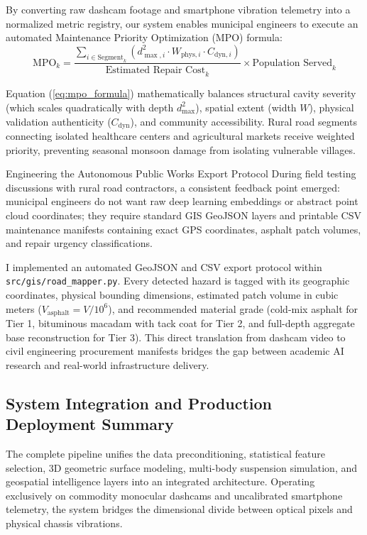 By converting raw dashcam footage and smartphone vibration telemetry into a normalized metric registry, our system enables municipal engineers to execute an automated Maintenance Priority Optimization (MPO) formula:
\begin{equation}
    \text{MPO}_k = \frac{\sum_{i \in \text{Segment}_k} \left( d_{\max, i}^2 \cdot W_{\text{phys}, i} \cdot C_{\text{dyn}, i} \right)}{\text{Estimated Repair Cost}_k} \times \text{Population Served}_k
    \label{eq:mpo_formula}
\end{equation}

Equation (\ref{eq:mpo_formula}) mathematically balances structural cavity severity (which scales quadratically with depth $d_{\max}^2$), spatial extent (width $W$), physical validation authenticity ($C_{\text{dyn}}$), and community accessibility. Rural road segments connecting isolated healthcare centers and agricultural markets receive weighted priority, preventing seasonal monsoon damage from isolating vulnerable villages.

\begin{designreflection}{Engineering the Autonomous Public Works Export Protocol}
During field testing discussions with rural road contractors, a consistent feedback point emerged: municipal engineers do not want raw deep learning embeddings or abstract point cloud coordinates; they require standard GIS GeoJSON layers and printable CSV maintenance manifests containing exact GPS coordinates, asphalt patch volumes, and repair urgency classifications.

I implemented an automated GeoJSON and CSV export protocol within \texttt{src/gis/road\_mapper.py}. Every detected hazard is tagged with its geographic coordinates, physical bounding dimensions, estimated patch volume in cubic meters ($V_{\text{asphalt}} = V / 10^6$), and recommended material grade (cold-mix asphalt for Tier 1, bituminous macadam with tack coat for Tier 2, and full-depth aggregate base reconstruction for Tier 3). This direct translation from dashcam video to civil engineering procurement manifests bridges the gap between academic AI research and real-world infrastructure delivery.
\end{designreflection}

\subsection{System Integration and Production Deployment Summary}
The complete pipeline unifies the data preconditioning, statistical feature selection, 3D geometric surface modeling, multi-body suspension simulation, and geospatial intelligence layers into an integrated architecture. Operating exclusively on commodity monocular dashcams and uncalibrated smartphone telemetry, the system bridges the dimensional divide between optical pixels and physical chassis vibrations. 

